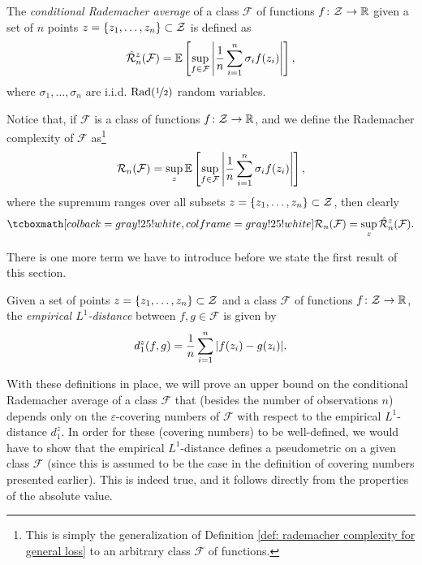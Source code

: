 \begin{definition}
The \emph{conditional Rademacher average} of a class $\mathcal{F}$ of functions $f \colon \mathcal{Z} \to \mathbb{R}$ given a set of $n$ points $z = \left\{z_1, \dots, z_n\right\} \subset \mathcal{Z}$ is defined as
\[
    \hat{\mathcal{R}}_n^z(\mathcal{F}) = \mathbb{E}\left[\sup_{f \in \mathcal{F}} \abs{\frac{1}{n} \sum_{i=1}^n \sigma_i f(z_i)}\right],
\]
where $\sigma_1, \dots, \sigma_n$ are i.i.d. $\mathrm{Rad}(\nicefrac{1}{2})$ random variables.
\end{definition}

Notice that, if $\mathcal{F}$ is a class of functions $f \colon \mathcal{Z} \to \mathbb{R}$, and we define the Rademacher complexity of $\mathcal{F}$ as\footnote{This is simply the generalization of Definition \ref{def: rademacher complexity for general loss} to an arbitrary class $\mathcal{F}$ of functions.}
\[
    \mathcal{R}_n(\mathcal{F}) = \sup_z \mathbb{E}\left[ \sup_{f \in \mathcal{F}} \abs{ \frac{1}{n} \sum_{i=1}^n \sigma_i f(z_i) }\right],
\]
where the supremum ranges over all subsets $z = \left\{z_1, \dots, z_n\right\} \subset \mathcal{Z}$, then clearly
\begin{equation}
\label{eq: rademacher complexity and conditional rademacher average}
    \highlightMath{
        \mathcal{R}_n(\mathcal{F}) = \sup_z \hat{\mathcal{R}}_n^z(\mathcal{F}).
    }
\end{equation}

There is one more term we have to introduce before we state the first result of this section.

\begin{definition}
Given a set of points $z = \left\{z_1, \dots, z_n\right\} \subset \mathcal{Z}$ and a class $\mathcal{F}$ of functions $f \colon \mathcal{Z} \to \mathbb{R}$, the \emph{empirical $L^1$-distance} between $f, g \in \mathcal{F}$ is given by
\[
    d_1^z(f, g) = \frac{1}{n} \sum_{i=1}^n \abs{f(z_i) - g(z_i)}.
\]
\end{definition}

With these definitions in place, we will prove an upper bound on the conditional Rademacher average of a class $\mathcal{F}$ that (besides the number of observations $n$) depends only on the $\varepsilon$-covering numbers of $\mathcal{F}$ with respect to the empirical $L^1$-distance $d_1^z$. In order for these (covering numbers) to be well-defined, we would have to show that the empirical $L^1$-distance defines a pseudometric on a given class $\mathcal{F}$ (since this is assumed to be the case in the definition of covering numbers presented earlier). This is indeed true, and it follows directly from the properties of the absolute value.

